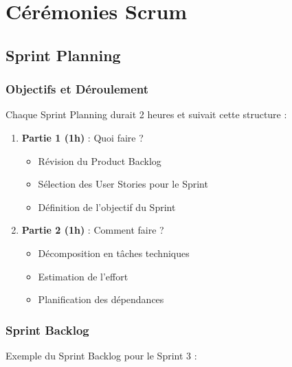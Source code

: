 \section{Cérémonies Scrum}

\subsection{Sprint Planning}

\subsubsection{Objectifs et Déroulement}

Chaque Sprint Planning durait 2 heures et suivait cette structure :
\begin{enumerate}
    \item \textbf{Partie 1 (1h)} : Quoi faire ?
    \begin{itemize}
        \item Révision du Product Backlog
        \item Sélection des User Stories pour le Sprint
        \item Définition de l'objectif du Sprint
    \end{itemize}
    
    \item \textbf{Partie 2 (1h)} : Comment faire ?
    \begin{itemize}
        \item Décomposition en tâches techniques
        \item Estimation de l'effort
        \item Planification des dépendances
    \end{itemize}
\end{enumerate}

\subsubsection{Sprint Backlog}

Exemple du Sprint Backlog pour le Sprint 3 :

